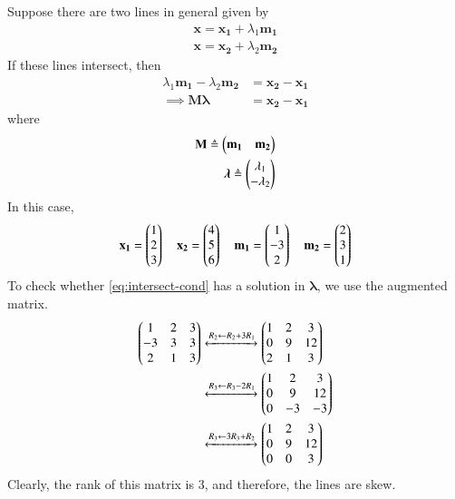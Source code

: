 \documentclass[journal,12pt,twocolumn]{IEEEtran}
\renewcommand{\vec}[1]{\boldsymbol{\mathbf{#1}}}
\begin{document}
\begin{enumerate}
    \solution Suppose there are two lines in general given by
    \begin{align}
        \vec{x} = \vec{x_1} + \lambda_1\vec{m_1} \label{eq:L1-gen} \\
        \vec{x} = \vec{x_2} + \lambda_2\vec{m_2} \label{eq:L2-gen}
    \end{align}
    If these lines intersect, then
    \begin{align}
        \lambda_1\vec{m_1} - \lambda_2\vec{m_2} &= \vec{x_2} - \vec{x_1} \\
        \implies \vec{M}\vec{\lambda} &= \vec{x_2} - \vec{x_1}
        \label{eq:intersect-cond}
    \end{align}
    where
    \begin{align}
        \vec{M} \triangleq \myvec{\vec{m_1} & \vec{m_2}} \label{eq:M-def} \\
        \vec{\lambda} \triangleq \myvec{\lambda_1\\-\lambda_2}
        \label{eq:lambda-def}
    \end{align}
    In this case,
    \begin{align}
        \vec{x_1} = \myvec{1\\2\\3} \quad \vec{x_2} = \myvec{4\\5\\6}
        \quad \vec{m_1} = \myvec{1\\-3\\2} \quad \vec{m_2} = \myvec{2\\3\\1}
        \label{eq:vals}
    \end{align}
    To check whether \eqref{eq:intersect-cond} has a solution in $\vec{\lambda}$,
    we use the augmented matrix.
    \begin{align}
        \begin{pmatrix}1&2&3\\-3&3&3\\2&1&3\end{pmatrix} &\xleftrightarrow[]{R_2\leftarrow R_2+3R_1} \begin{pmatrix}1&2&3\\0&9&12\\2&1&3\end{pmatrix} \\
                &\xleftrightarrow[]{R_3\leftarrow R_3-2R_1} \begin{pmatrix}1&2&3\\0&9&12\\0&-3&-3\end{pmatrix} \\
                &\xleftrightarrow[]{R_3\leftarrow 3R_3+R_2} \begin{pmatrix}1&2&3\\0&9&12\\0&0&3\end{pmatrix}
                \label{eq:rank-aug}
    \end{align}
    Clearly, the rank of this matrix is 3, and therefore, the lines are skew.


\end{enumerate}
\end{document}
